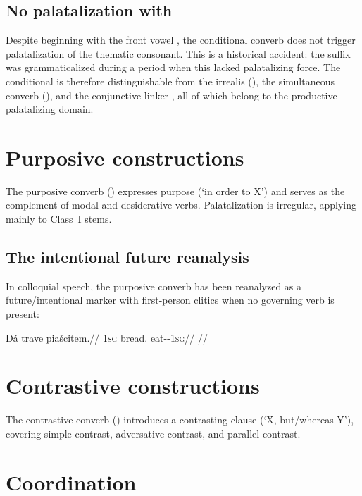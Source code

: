 \subsection{No palatalization with }\label{sec:cond-nopala}

Despite beginning with the front vowel , the conditional converb  does not trigger palatalization of the thematic consonant. This is a historical accident: the suffix was grammaticalized during a period when this  lacked palatalizing force. The conditional is therefore distinguishable from the irrealis (), the simultaneous converb (), and the conjunctive linker , all of which belong to the productive palatalizing domain.

\section{Purposive constructions}\label{sec:purposive}

The purposive converb () expresses purpose (`in order to X') and serves as the complement of modal and desiderative verbs. Palatalization is irregular, applying mainly to Class~I stems.

\subsection{The intentional future reanalysis}

In colloquial speech, the purposive converb has been reanalyzed as a future/intentional marker with first-person clitics when no governing verb is present:

\ex
\begingl
\gla Dá trave piašcitem.//
\glb \textsc{1sg} bread.\Ind{} eat-\Purp{}-\textsc{1sg}//
\glft {} //
\endgl
\xe

\section{Contrastive constructions}\label{sec:contrastive}

The contrastive converb () introduces a contrasting clause (`X, but/whereas Y'), covering simple contrast, adversative contrast, and parallel contrast.

\section{Coordination}\label{sec:coordination}

